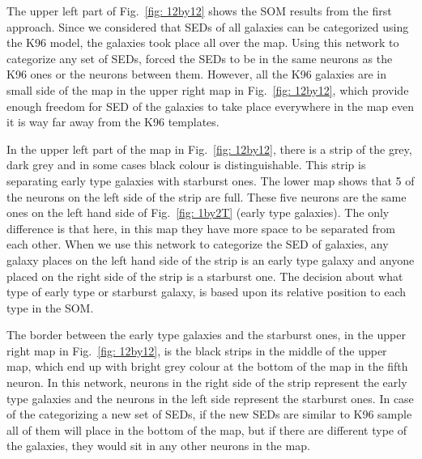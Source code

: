     The upper left part of Fig.~\ref{fig: 12by12} shows the SOM results from the first approach. 
    Since we considered that SEDs of all galaxies can be categorized using the K96 model, the galaxies took place all over the map.
    Using this network to categorize any set of SEDs, forced the SEDs to be in the same neurons as the K96 ones or the neurons between them.
    However, all the K96 galaxies are in small side of the map in the upper right map in Fig.~\ref{fig: 12by12}, which provide enough freedom for SED of the galaxies to take place everywhere in the map even it is way far away from the K96 templates.
    
    In the upper left part of the map in Fig.~\ref{fig: 12by12}, there is a strip of the grey, dark grey and in some cases black colour is distinguishable. %
    This strip is separating early type galaxies with starburst ones.
    The lower map shows that 5 of the neurons on the left side of the strip are full. 
    These five neurons are the same ones on the left hand side of Fig.~\ref{fig: 1by2T} (early type galaxies).
    The only difference is that here, in this map they have more space to be separated from each other.
    When we use this network to categorize the SED of galaxies, any galaxy places on the left hand side of the strip is an early type galaxy and anyone placed on the right side of the strip is a starburst one.
    The decision about what type of early type or starburst galaxy, is based upon its relative position to each type in the SOM.
    
    The border between the early type galaxies and the starburst ones, in the upper right map in Fig.~\ref{fig: 12by12}, is the black strips in the middle of the upper map, which end up with bright grey colour at the bottom of the map in the fifth neuron.
    In this network, neurons in the right side of the strip represent the early type galaxies and the neurons in the left side represent the starburst ones. 
    In case of the categorizing a new set of SEDs, if the new SEDs are similar to K96 sample all of them will place in the bottom of the map, but if there are different type of the galaxies, they would sit in any other neurons in the map.
    
